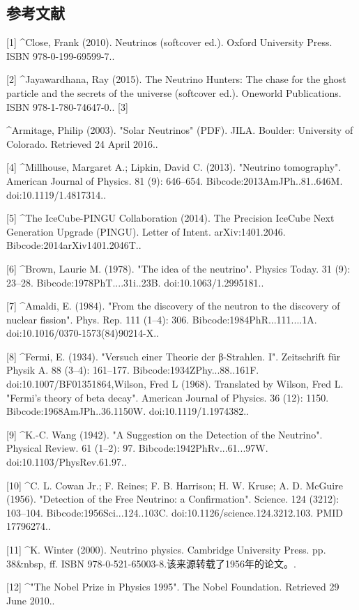 \subsection{参考文献}
[1]
^Close, Frank (2010). Neutrinos (softcover ed.). Oxford University Press. ISBN 978-0-199-69599-7..

[2]
^Jayawardhana, Ray (2015). The Neutrino Hunters: The chase for the ghost particle and the secrets of the universe (softcover ed.). Oneworld Publications. ISBN 978-1-780-74647-0..
[3]

^Armitage, Philip (2003). "Solar Neutrinos" (PDF). JILA. Boulder: University of Colorado. Retrieved 24 April 2016..

[4]
^Millhouse, Margaret A.; Lipkin, David C. (2013). "Neutrino tomography". American Journal of Physics. 81 (9): 646–654. Bibcode:2013AmJPh..81..646M. doi:10.1119/1.4817314..

[5]
^The IceCube-PINGU Collaboration (2014). The Precision IceCube Next Generation Upgrade (PINGU). Letter of Intent. arXiv:1401.2046. Bibcode:2014arXiv1401.2046T..

[6]
^Brown, Laurie M. (1978). "The idea of the neutrino". Physics Today. 31 (9): 23–28. Bibcode:1978PhT....31i..23B. doi:10.1063/1.2995181..

[7]
^Amaldi, E. (1984). "From the discovery of the neutron to the discovery of nuclear fission". Phys. Rep. 111 (1–4): 306. Bibcode:1984PhR...111....1A. doi:10.1016/0370-1573(84)90214-X..

[8]
^Fermi, E. (1934). "Versuch einer Theorie der β-Strahlen. I". Zeitschrift für Physik A. 88 (3–4): 161–177. Bibcode:1934ZPhy...88..161F. doi:10.1007/BF01351864,Wilson, Fred L (1968). Translated by Wilson, Fred L. "Fermi's theory of beta decay". American Journal of Physics. 36 (12): 1150. Bibcode:1968AmJPh..36.1150W. doi:10.1119/1.1974382..

[9]
^K.-C. Wang (1942). "A Suggestion on the Detection of the Neutrino". Physical Review. 61 (1–2): 97. Bibcode:1942PhRv...61...97W. doi:10.1103/PhysRev.61.97..

[10]
^C. L. Cowan Jr.; F. Reines; F. B. Harrison; H. W. Kruse; A. D. McGuire (1956). "Detection of the Free Neutrino: a Confirmation". Science. 124 (3212): 103–104. Bibcode:1956Sci...124..103C. doi:10.1126/science.124.3212.103. PMID 17796274..

[11]
^K. Winter (2000). Neutrino physics. Cambridge University Press. pp. 38&nbsp, ff. ISBN 978-0-521-65003-8.该来源转载了1956年的论文。.

[12]
^"The Nobel Prize in Physics 1995". The Nobel Foundation. Retrieved 29 June 2010..

